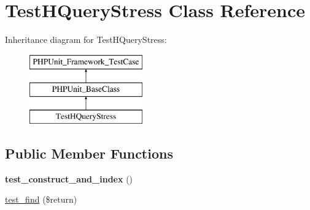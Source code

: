 \hypertarget{classTestHQueryStress}{}\section{Test\+H\+Query\+Stress Class Reference}
\label{classTestHQueryStress}
Inheritance diagram for Test\+H\+Query\+Stress\+:\begin{figure}[H]
\begin{center}
\leavevmode
\includegraphics[height=3.000000cm]{classTestHQueryStress}
\end{center}
\end{figure}
\subsection*{Public Member Functions}
\begin{DoxyCompactItemize}
\item 
\mbox{\label{classTestHQueryStress_ab39335c67f55f3e41a0ed332271c2148}} 
{\bfseries test\+\_\+construct\+\_\+and\+\_\+index} ()
\item 
\mbox{\hyperlink{classTestHQueryStress_a4d0da0525a188b27349ffd2b72986fcc}{test\+\_\+find}} (\$return)
\end{DoxyCompactItemize}
